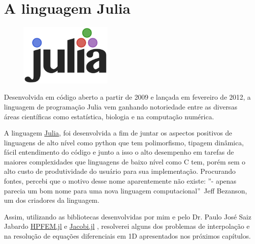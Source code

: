  
\section{A linguagem Julia}
\begin{figure}[H]
\centering
\includegraphics[width=0.4\textwidth,left]{figuras/julia.png}
\end{figure}
Desenvolvida em código aberto a partir de 2009 e lançada em fevereiro de 2012, a linguagem de programação Julia vem ganhando notoriedade entre as diversas áreas científicas como estatística, biologia e na computação numérica.

A linguagem \href{http://julialang.org/}{Julia}, foi desenvolvida a fim de juntar os aspectos positivos de linguagens de alto nível como python que tem polimorfismo, tipagem dinâmica, fácil entendimento do código e junto a isso o alto desempenho em tarefas de maiores complexidades que linguagens de baixo nível como C tem, porém sem o  alto custo de produtividade do usuário para sua implementação. Procurando fontes, percebi que o motivo desse nome aparentemente não existe: ''- apenas parecia um bom nome para uma nova linguagem computacional''\  Jeff Bezanson, um dos criadores da linguagem.

Assim, utilizando as bibliotecas desenvolvidas por mim e pelo  Dr. Paulo José Saiz Jabardo \href{www.github.com/pjabardo/HPFEM.jl}{HPFEM.jl} e \href{www.github.com/pjabardo/Jacobi.jl}{Jacobi.jl} , resolverei alguns dos problemas de interpolação e na resolução de equações diferenciais em 1D apresentados nos próximos capítulos.
 
\pagebreak

%
%
%




